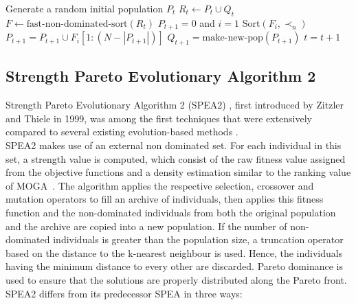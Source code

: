 \begin{algorithm}[H]
\caption{NSGAII}
\label{nsgaii_alg}
\SetAlgoLined
Generate a random initial population $P_t$\;
$R_t \gets P_t \cup Q_t$ \; \;
$F \gets \text{fast-non-dominated-sort}(R_t)$\; \;
$P_{t+1} = 0$ and $i = 1$\;
$\text{Sort}(F_i, \prec_n)$\;
$P_{t+1} = P_{t+1} \cup F_i[1:(N-|P_{t+1}|)]$\;
$Q_{t+1} = \text{make-new-pop}(P_{t+1})$\;
$t = t+1$\;
\end{algorithm}

\subsection{Strength Pareto Evolutionary Algorithm 2}

Strength Pareto Evolutionary Algorithm 2 (SPEA2) \cite{zitzler2001spea2}, first introduced by Zitzler and Thiele in 1999, was among the first techniques that were extensively compared to several existing evolution-based methods \cite{coello2007evolutionary}.\\

SPEA2 makes use of an external non dominated set. For each individual in this set, a strength value is computed, which consist of the raw fitness value assigned from the objective functions and a density estimation similar to the ranking value of MOGA~\cite{fonseca1993genetic}. The algorithm applies the respective selection, crossover and mutation operators to fill an archive of individuals, then applies this fitness function and the non-dominated individuals from both the original population and the archive are copied into a new population. If the number of non-dominated individuals is greater than the population size, a truncation operator based on the distance to the k-nearest neighbour is used. Hence, the individuals having the minimum distance to every other are discarded. Pareto dominance is used to ensure that the solutions are properly distributed along the Pareto front. SPEA2 differs from its predecessor SPEA in three ways: \\ 

